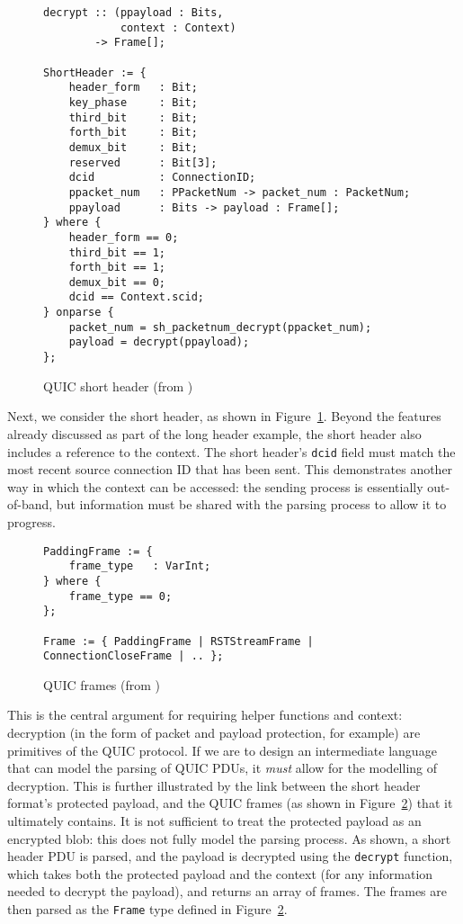 \documentclass[10pt,sigconf]{acmart}
\begin{document}
\begin{figure}
	\vspace{3mm}
    \begin{BVerbatim}[fontsize=\scriptsize]
decrypt :: (ppayload : Bits, 
            context : Context) 
        -> Frame[];
                     
ShortHeader := {
	header_form   : Bit;
	key_phase     : Bit;
	third_bit     : Bit;
	forth_bit     : Bit;
	demux_bit     : Bit;
	reserved      : Bit[3];
	dcid          : ConnectionID;
	ppacket_num   : PPacketNum -> packet_num : PacketNum;
	ppayload      : Bits -> payload : Frame[];
} where {
	header_form == 0;
	third_bit == 1;
	forth_bit == 1;
	demux_bit == 0;
	dcid == Context.scid;
} onparse {
	packet_num = sh_packetnum_decrypt(ppacket_num);
	payload = decrypt(ppayload);
};
    \end{BVerbatim}
    \caption{QUIC short header (from \cite{draft-ietf-quic-transport-latest})}
    \label{fig:quic-short-hdr-desc}
\end{figure}

Next, we consider the short header, as shown in Figure~\ref{fig:quic-short-hdr-desc}.
Beyond the features already discussed as part of the long header example, the short header
also includes a reference to the context. The short header's \texttt{dcid} field must
match the most recent source connection ID that has been sent. This demonstrates another
way in which the context can be accessed: the sending process is essentially out-of-band,
but information must be shared with the parsing process to allow it to progress.

\begin{figure}
	\vspace{3mm}
    \begin{BVerbatim}[fontsize=\scriptsize]
PaddingFrame := {
	frame_type   : VarInt;
} where {
	frame_type == 0;
};

Frame := { PaddingFrame | RSTStreamFrame | ConnectionCloseFrame | .. };
    \end{BVerbatim}
    \caption{QUIC frames (from \cite{draft-ietf-quic-transport-latest})}
    \label{fig:quic-frame-desc}
\end{figure}

This is the central argument for requiring helper functions and context: decryption (in
the form of packet and payload protection, for example) are primitives of the QUIC
protocol. If we are to design an intermediate language that can model the parsing of QUIC
PDUs, it \emph{must} allow for the modelling of decryption. This is further illustrated
by the link between the short header format's protected payload, and the QUIC frames (as
shown in Figure~\ref{fig:quic-frame-desc}) that it ultimately contains. It is not sufficient
to treat the protected payload as an encrypted blob: this does not fully model the parsing
process. As shown, a short header PDU is parsed, and the payload is decrypted using the
\texttt{decrypt} function, which takes both the protected payload and the context (for any
information needed to decrypt the payload), and returns an array of frames. The frames are
then parsed as the \texttt{Frame} type defined in Figure~\ref{fig:quic-frame-desc}.
\end{document}
